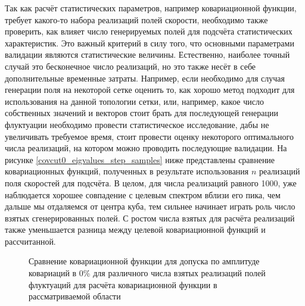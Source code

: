 Так как расчёт статистических параметров, например ковариационной функции, требует какого-то набора реализаций полей скорости, необходимо также проверить, как влияет число генерируемых полей для подсчёта статистических характеристик. Это важный критерий в силу того, что основными параметрами валидации являются статистические величины. Естественно, наиболее точный случай это бесконечное число реализаций, но это также несёт в себе дополнительные временные затраты. Например, если необходимо для случая генерации поля на некоторой сетке оценить то, как хорошо метод подходит для использования на данной топологии сетки, или, например, какое число собственных значений и векторов стоит брать для последующей генерации флуктуации необходимо провести статистическое исследование, дабы не увеличивать требуемое время, стоит провести оценку некоторого оптимального числа реализаций, на котором можно проводить последующие валидации. На рисунке \ref{covcut0_eigvalues_step_samples} ниже представлены сравнение ковариационных функций, полученных в результате использования $n$ реализаций поля скоростей для подсчёта. В целом, для числа реализаций равного 1000, уже наблюдается хорошее совпадение с целевым спектром вблизи его пика, чем дальше мы отдаляемся от центра куба, тем сильнее начинает играть роль число взятых сгенерированных полей. С ростом числа взятых для расчёта реализаций также уменьшается разница между целевой ковариационной функций и рассчитанной.

\begin{figure}[!ht]
    
    \caption{Сравнение ковариационной функции для допуска по амплитуде ковариаций в 0\% для различного числа взятых реализаций полей флуктуаций для расчёта ковариационной функции в рассматриваемой области}
    \label{img:covcut0_eigvalues_step_samples}  
\end{figure}

